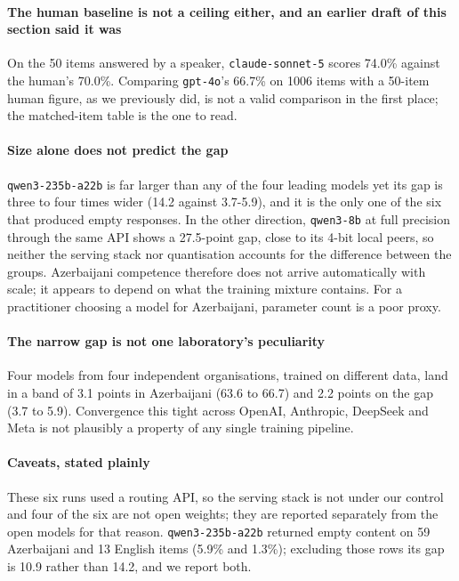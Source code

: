 \documentclass[final]{clv2025}
\begin{document}
\paragraph{The human baseline is not a ceiling either, and an earlier draft of
this section said it was} On the 50 items answered by a speaker,
\texttt{claude-sonnet-5} scores 74.0\% against the human's 70.0\%. Comparing
\texttt{gpt-4o}'s 66.7\% on 1006 items with a 50-item human figure, as we
previously did, is not a valid comparison in the first place; the matched-item
table is the one to read.

\paragraph{Size alone does not predict the gap} \texttt{qwen3-235b-a22b} is
far larger than any of the four leading models yet its gap is three to four
times wider (14.2 against 3.7-5.9), and it is the only one of the six that
produced empty responses. In the other direction, \texttt{qwen3-8b} at full
precision through the same API shows a 27.5-point gap, close to its 4-bit local
peers, so neither the serving stack nor quantisation accounts for the
difference between the groups. Azerbaijani competence therefore does not arrive
automatically with scale; it appears to depend on what the training mixture
contains. For a practitioner choosing a model for Azerbaijani, parameter count
is a poor proxy.

\paragraph{The narrow gap is not one laboratory's peculiarity} Four models
from four independent organisations, trained on different data, land in a band
of 3.1 points in Azerbaijani (63.6 to 66.7) and 2.2 points on the gap (3.7 to
5.9). Convergence this tight across OpenAI, Anthropic, DeepSeek and Meta is not
plausibly a property of any single training pipeline.

\paragraph{Caveats, stated plainly} These six runs used a routing API, so the
serving stack is not under our control and four of the six are not open
weights; they are reported separately from the open models for that reason.
\texttt{qwen3-235b-a22b} returned empty content on 59 Azerbaijani and 13
English items (5.9\% and 1.3\%); excluding those rows its gap is 10.9 rather
than 14.2, and we report both.
\end{document}
